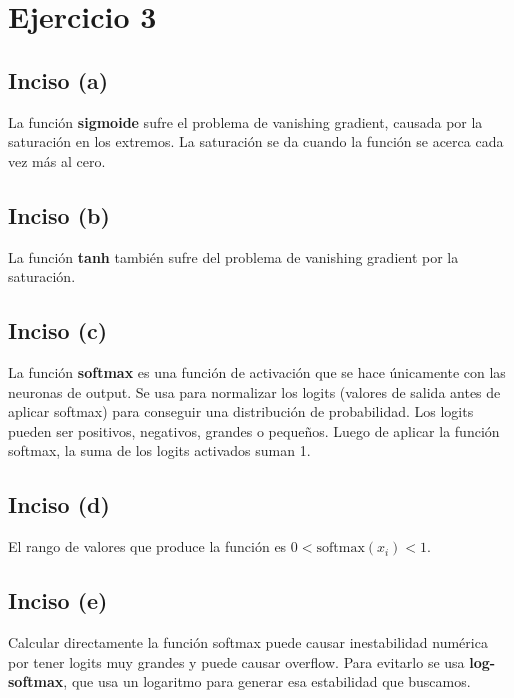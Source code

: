 \documentclass[12pt, a4paper]{article}
\begin{document}
    \section*{Ejercicio 3}
        \subsection*{Inciso (a)}
            \noindent La función \textbf{sigmoide} sufre el problema de vanishing gradient, causada por la saturación en los extremos. La saturación se da cuando la función se acerca cada vez más al cero.
        \subsection*{Inciso (b)}
            \noindent La función \textbf{tanh} también sufre del problema de vanishing gradient por la saturación.
        \subsection*{Inciso (c)}
            \noindent La función \textbf{softmax} es una función de activación que se hace únicamente con las neuronas de output. Se usa para normalizar los logits (valores de salida antes de aplicar softmax) para conseguir una distribución de probabilidad. Los logits pueden ser positivos, negativos, grandes o pequeños. Luego de aplicar la función softmax, la suma de los logits activados suman 1.
        \subsection*{Inciso (d)}
            \noindent El rango de valores que produce la función es \(0 < \text{softmax}(x_{i}) < 1\).
        \subsection*{Inciso (e)}
            \noindent Calcular directamente la función softmax puede causar inestabilidad numérica por tener logits muy grandes y puede causar overflow. Para evitarlo se usa \textbf{log-softmax}, que usa un logaritmo para generar esa estabilidad que buscamos.
\end{document}
